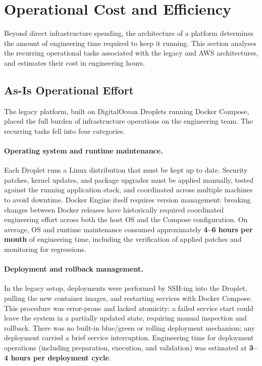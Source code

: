 \section{Operational Cost and Efficiency}
\label{sec:operational}

Beyond direct infrastructure spending, the architecture of a platform
determines the amount of engineering time required to keep it running.
This section analyses the recurring operational tasks associated with
the legacy and AWS architectures, and estimates their cost in
engineering hours.

\subsection{As-Is Operational Effort}

The legacy platform, built on DigitalOcean Droplets running Docker
Compose, placed the full burden of infrastructure operations on the
engineering team.
The recurring tasks fell into four categories.

\paragraph{Operating system and runtime maintenance.}
Each Droplet runs a Linux distribution that must be kept up to date.
Security patches, kernel updates, and package upgrades must be applied
manually, tested against the running application stack, and coordinated
across multiple machines to avoid downtime.
Docker Engine itself requires version management: breaking changes
between Docker releases have historically required coordinated
engineering effort across both the host OS and the Compose
configuration.
On average, OS and runtime maintenance consumed approximately
\textbf{4--6 hours per month} of engineering time, including the
verification of applied patches and monitoring for regressions.

\paragraph{Deployment and rollback management.}
In the legacy setup, deployments were performed by SSH-ing into
the Droplet, pulling the new container images, and restarting
services with Docker Compose.
This procedure was error-prone and lacked atomicity: a failed service
start could leave the system in a partially updated state, requiring
manual inspection and rollback.
There was no built-in blue/green or rolling deployment mechanism;
any deployment carried a brief service interruption.
Engineering time for deployment operations (including preparation,
execution, and validation) was estimated at \textbf{3--4 hours per
deployment cycle}.

